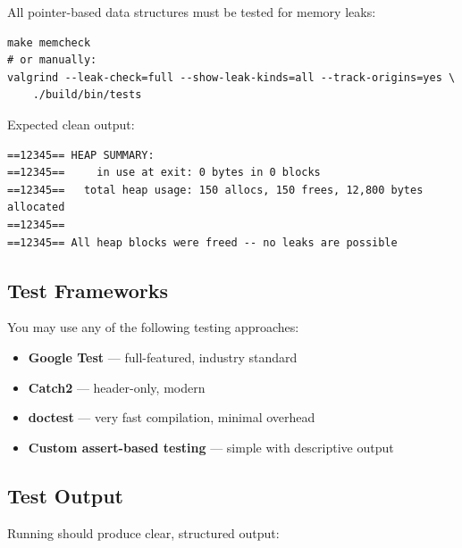 All pointer-based data structures must be tested for memory leaks:

\begin{lstlisting}[style=bash]
make memcheck
# or manually:
valgrind --leak-check=full --show-leak-kinds=all --track-origins=yes \
    ./build/bin/tests
\end{lstlisting}

Expected clean output:

\begin{lstlisting}[style=plaintext]
==12345== HEAP SUMMARY:
==12345==     in use at exit: 0 bytes in 0 blocks
==12345==   total heap usage: 150 allocs, 150 frees, 12,800 bytes allocated
==12345==
==12345== All heap blocks were freed -- no leaks are possible
\end{lstlisting}

\subsection{Test Frameworks}

You may use any of the following testing approaches:

\begin{itemize}
  \item \textbf{Google Test} --- full-featured, industry standard
  \item \textbf{Catch2} --- header-only, modern \cpp
  \item \textbf{doctest} --- very fast compilation, minimal overhead
  \item \textbf{Custom assert-based testing} --- simple  with descriptive output
\end{itemize}

\subsection{Test Output}

Running \maketest{} should produce clear, structured output:

